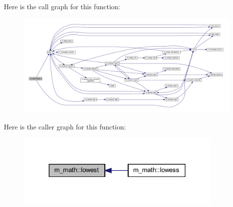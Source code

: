 Here is the call graph for this function\+:
\nopagebreak
\begin{figure}[H]
\begin{center}
\leavevmode
\includegraphics[width=350pt]{namespacem__math_a06b587e00199906f1f87f1a7b101d71f_cgraph}
\end{center}
\end{figure}
Here is the caller graph for this function\+:
\nopagebreak
\begin{figure}[H]
\begin{center}
\leavevmode
\includegraphics[width=290pt]{namespacem__math_a06b587e00199906f1f87f1a7b101d71f_icgraph}
\end{center}
\end{figure}
\mbox{\label{namespacem__math_ac25d73a9718db8167b0ad99331366553}} 
